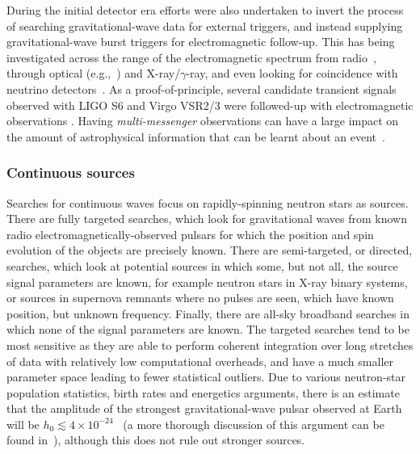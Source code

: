 During the initial detector era efforts were also undertaken to invert the process of searching gravitational-wave data for external 
triggers, and instead supplying gravitational-wave burst triggers for electromagnetic follow-up. This has
being investigated across the range of the electromagnetic spectrum from radio~\cite{Predoi:2010}, through
optical (e.g.,~\cite{Kanner:2008, Coward:2010}) and X-ray/$\gamma$-ray, and even looking for coincidence with 
neutrino detectors~\cite{Aso:2008, Pradier:2010, Chassande:2010}. As a proof-of-principle, several candidate transient signals observed
with LIGO S6 and Virgo VSR2/3 were followed-up with electromagnetic observations \cite{2012A&A...539A.124L, 2012A&A...541A.155A, 2012ApJS..203...28E, 2014ApJS..211....7A}. 
Having \textit{multi-messenger} observations can have a large impact on the amount of astrophysical information that can be learnt about
an event~\cite{Phinney:2009}.

\subsubsection{Continuous sources}

Searches for continuous waves focus on rapidly-spinning neutron stars as sources. There are fully targeted 
searches, which look for gravitational waves from known radio electromagnetically-observed pulsars for which 
the position and spin evolution of the objects are precisely known. There are semi-targeted, or directed, 
searches, which look at potential sources in which some, but not all, the source signal parameters are known, 
for example neutron stars in X-ray binary systems, or sources in supernova remnants where no pulses are seen, 
which have known position, but unknown frequency. Finally, there are all-sky broadband searches in which none 
of the signal parameters are known. The targeted searches tend to be most sensitive as they are able to 
perform coherent integration over long stretches of data with relatively low computational overheads, and 
have a much smaller parameter space leading to fewer statistical outliers. Due to various neutron-star 
population statistics, birth rates and energetics arguments, there is an estimate that the amplitude of the 
strongest gravitational-wave pulsar observed at Earth will be $h_0 \lesssim 
4\times10^{-24}$~\cite{Abbott:2007a} (a more thorough discussion of this argument can be found 
in~\cite{Knispel:2008}), although this does not rule out stronger sources.

